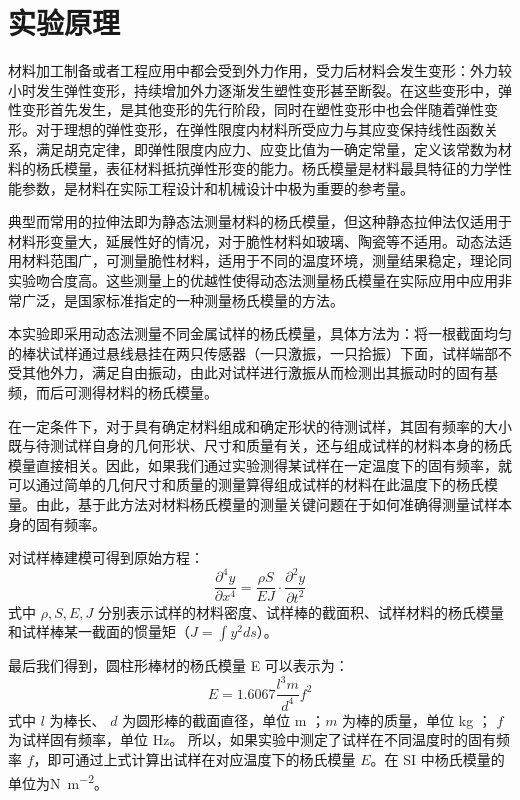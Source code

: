 \documentclass[a4paper,utf8]{article}
\begin{document}
\section{实验原理}%
    材料加工制备或者工程应用中都会受到外力作用，受力后材料会发生变形：外力较小时发生弹性变形，持续增加外力逐渐发生塑性变形甚至断裂。在这些变形中，弹性变形首先发生，是其他变形的先行阶段，同时在塑性变形中也会伴随着弹性变形。对于理想的弹性变形，在弹性限度内材料所受应力与其应变保持线性函数关系，满足胡克定律，即弹性限度内应力、应变比值为一确定常量，定义该常数为材料的杨氏模量，表征材料抵抗弹性形变的能力。杨氏模量是材料最具特征的力学性能参数，是材料在实际工程设计和机械设计中极为重要的参考量。\par
    典型而常用的拉伸法即为静态法测量材料的杨氏模量，但这种静态拉伸法仅适用于材料形变量大，延展性好的情况，对于脆性材料如玻璃、陶瓷等不适用。动态法适用材料范围广，可测量脆性材料，适用于不同的温度环境，测量结果稳定，理论同实验吻合度高。这些测量上的优越性使得动态法测量杨氏模量在实际应用中应用非常广泛，是国家标准指定的一种测量杨氏模量的方法。\par
    本实验即采用动态法测量不同金属试样的杨氏模量，具体方法为：将一根截面均匀的棒状试样通过悬线悬挂在两只传感器（一只激振，一只拾振）下面，试样端部不受其他外力，满足自由振动，由此对试样进行激振从而检测出其振动时的固有基频，而后可测得材料的杨氏模量。\par
    在一定条件下，对于具有确定材料组成和确定形状的待测试样，其固有频率的大小既与待测试样自身的几何形状、尺寸和质量有关，还与组成试样的材料本身的杨氏模量直接相关。因此，如果我们通过实验测得某试样在一定温度下的固有频率，就可以通过简单的几何尺寸和质量的测量算得组成试样的材料在此温度下的杨氏模量。由此，基于此方法对材料杨氏模量的测量关键问题在于如何准确得测量试样本身的固有频率。\par
    对试样棒建模可得到原始方程：
    \begin{equation}
        \frac{\partial^4y}{\partial x^4}=\frac{\rho S}{EJ}\cdot\frac{\partial^2y}{\partial t^2}
    \end{equation}
    式中 $\rho,S,E,J$ 分别表示试样的材料密度、试样棒的截面积、试样材料的杨氏模量和试样棒某一截面的惯量矩（$J=\int y^2ds$）。\par
    最后我们得到，圆柱形棒材的杨氏模量 E 可以表示为：
    \begin{equation}
        E=1.6067\frac{l^3m}{d^4}f^2\label{eq:2}
    \end{equation}
    式中 $l$ 为棒长、 $d$ 为圆形棒的截面直径，单位 \unit{\m} ；$m$ 为棒的质量，单位 \unit{\kg} ； $f$为试样固有频率，单位 \unit{\Hz}。 所以，如果实验中测定了试样在不同温度时的固有频率 $f$，即可通过上式计算出试样在对应温度下的杨氏模量 $E$。在 SI 中杨氏模量的单位为\unit{\N\per\m^2}。\par
\end{document}
